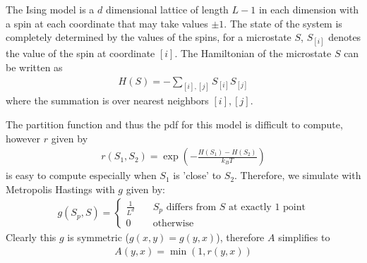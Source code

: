 \documentclass{article}
\begin{document}
The Ising model is a $d$ dimensional lattice of length $L - 1$ in each dimension with a spin at each coordinate that may take values $\pm 1$.
The state of the system is completely determined by the values of the spins,
for a microstate $S$, $S_{[i]}$ denotes the value of the spin at coordinate $[i]$.
The Hamiltonian of the microstate $S$ can be written as
\begin{align*}
    H(S) = - \sum_{[i],[j]} S_{[i]} S_{[j]}
\end{align*}
where the summation is over nearest neighbors $[i], [j]$.

The partition function and thus the pdf for this model is difficult to compute, however $r$ given by
\begin{align*}
    r(S_1, S_2) = \exp\left(-\frac{H(S_1) - H(S_2)}{k_B T}\right)
\end{align*}
is easy to compute especially when $S_1$ is 'close' to $S_2$.
Therefore, we simulate with Metropolis Hastings with $g$ given by:
\begin{align*}
    g(S_p, S) = \begin{cases}
        \frac{1}{L^d}\quad &\text{$S_p$ differs from $S$ at exactly $1$ point} \\
        0 &\text{otherwise}
    \end{cases}
\end{align*}
Clearly this $g$ is symmetric ($g(x, y) = g(y, x)$), therefore $A$ simplifies to
\begin{align*}
    A(y, x) = \min(1, r(y, x))
\end{align*}
\end{document}
